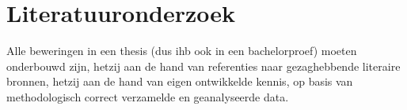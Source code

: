 \chapter{Literatuuronderzoek}
\label{ch:literatuuronderzoek}


Alle beweringen in een thesis (dus ihb ook in een bachelorproef) moeten onderbouwd zijn, hetzij aan de hand van referenties naar gezaghebbende literaire bronnen, hetzij aan de hand van eigen ontwikkelde kennis, op basis van methodologisch correct verzamelde en geanalyseerde data.


